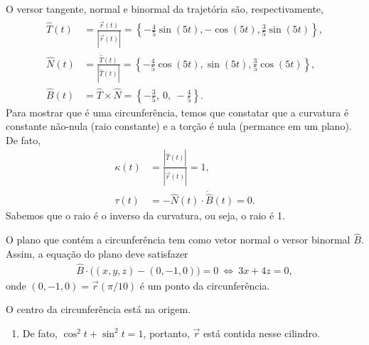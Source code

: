 \begin{questions}
\begin{solution}
    O versor tangente, normal e binormal da trajetória são, respectivamente,
    \begin{align*}
        \hat{T}(t) &= \frac{\dot{\vec r}(t)}{|\dot{\vec r}(t)|}
            = \left\{-\tfrac{4}{5} \sin (5 t),-\cos (5 t),\tfrac{3}{5} \sin (5 t)\right\} , \\
        \hat{N}(t) &= \frac{\dot{\hat T}(t)}{|\dot{\hat T}(t)|} = \left\{-\tfrac{4}{5} \cos (5 t),\sin (5 t),\tfrac{3}{5} \cos (5 t)\right\}, \\
        \hat{B}(t) &= \hat{T} \times \hat{N} = \left\{-\frac{3}{5},~0,~-\frac{4}{5}\right\}.
    \end{align*}
    Para mostrar que é uma circunferência, temos que constatar que a curvatura é constante não-nula (raio constante) e a torção é nula (permance em um plano). De fato,
    \begin{align*}
        \kappa(t) &= \frac{|\dot{\hat T}(t)|}{|\dot{\vec r}(t)|} = 1,\\
        \tau(t) &= - \hat{N}(t)\cdot\dot{\hat{B}}(t) = 0.
    \end{align*}
    Sabemos que o raio é o inverso da curvatura, ou seja, o raio é 1.
    
    O plano que contém a circunferência tem como vetor normal o versor binormal $\hat{B}$. Assim, a equação do plano deve satisfazer
    \begin{align*}
        \hat{B}\cdot\big((x,y,z)-(0,-1,0)\big) = 0 
            ~\Leftrightarrow~ 3x + 4z = 0,
    \end{align*}
    onde $(0,-1,0) = \vec{r}(\pi/10)$ é um ponto da circunferência.
    
    O centro da circunferência está na origem.
\end{solution}

\begin{solution}
  \begin{enumerate}[label=(\alph*)]
    \item De fato, $\cos^2 t + \sin^2 t = 1$, portanto, $\vec r$ está contida nesse cilindro.
    

\end{enumerate}
\end{solution}
\end{questions}
